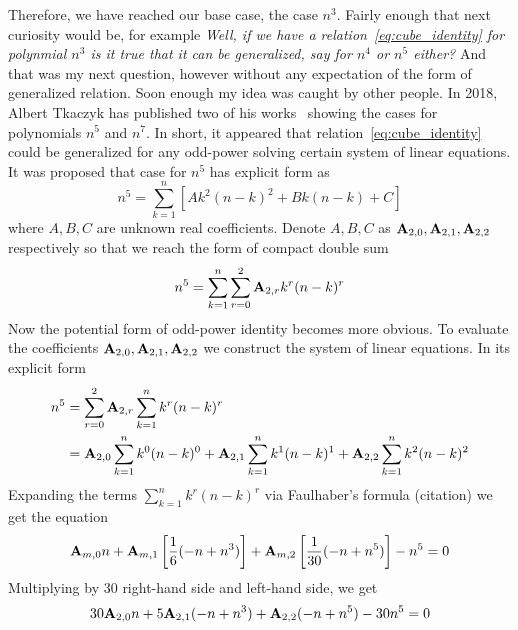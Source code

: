 Therefore, we have reached our base case, the case $n^3$.
Fairly enough that next curiosity would be, for example
\textit{Well, if we have a relation~\eqref{eq:cube_identity}
for polynmial $n^3$ is it true that it can be generalized, say for $n^4$ or $n^5$ either?}
And that was my next question, however without any expectation of the form of generalized relation.
Soon enough my idea was caught by other people.
In 2018, Albert Tkaczyk has published two of his works~\cite{tkaczyk2018problem, tkaczyk2018continuation}
showing the cases for polynomials $n^5$ and $n^7$.
In short, it appeared that relation~\eqref{eq:cube_identity} could be generalized
for any odd-power solving certain system of linear equations.
It was proposed that case for $n^5$ has explicit form as
\begin{equation*}
    n^5 = \sum_{k=1}^{n} \left[ A k^2(n-k)^2 + Bk(n-k) + C \right]
\end{equation*}
where $A,B,C$ are unknown real coefficients.
Denote $A,B,C$ as ${\mathbf{A}} \sb{2,0}, {\mathbf{A}} \sb{2,1}, {\mathbf{A}} \sb{2,2}$ respectively
so that we reach the form of compact double sum
\begin{equation*}
    n^5 = \sum_{k=1}^{n} \sum_{r=0}^{2} {\mathbf{A}} \sb{2,r} k^r (n-k)^r
\end{equation*}
Now the potential form of odd-power identity becomes more obvious.
To evaluate the coefficients ${\mathbf{A}} \sb{2,0}, {\mathbf{A}} \sb{2,1}, {\mathbf{A}} \sb{2,2}$
we construct the system of linear equations.
In its explicit form
\begin{equation*}
    \begin{split}
        n^5 &= \sum_{r=0}^{2} {\mathbf{A}} \sb{2,r} \sum_{k=1}^{n} k^r (n-k)^r \\
        &= {\mathbf{A}} \sb{2,0} \sum_{k=1}^{n} k^0 (n-k)^0 + {\mathbf{A}} \sb{2,1} \sum_{k=1}^{n} k^1 (n-k)^1 + {\mathbf{A}} \sb{2,2} \sum_{k=1}^{n} k^2 (n-k)^2
    \end{split}
\end{equation*}
Expanding the terms $\sum_{k=1}^{n} k^r (n-k)^r$ via Faulhaber's formula (citation) we get the equation
\begin{equation*}
    {\mathbf{A}} \sb{m,0} n
    + {\mathbf{A}} \sb{m,1} \left[ \frac{1}{6} (-n + n^3) \right]
    + {\mathbf{A}} \sb{m,2} \left[ \frac{1}{30} (-n + n^5) \right] - n^5 = 0
\end{equation*}
Multiplying by $30$ right-hand side and left-hand side, we get
\begin{equation*}
    30 {\mathbf{A}} \sb{2,0} n + 5 {\mathbf{A}} \sb{2,1} (-n + n^3) + {\mathbf{A}} \sb{2,2} (-n + n^5) - 30n^5 = 0
\end{equation*}
